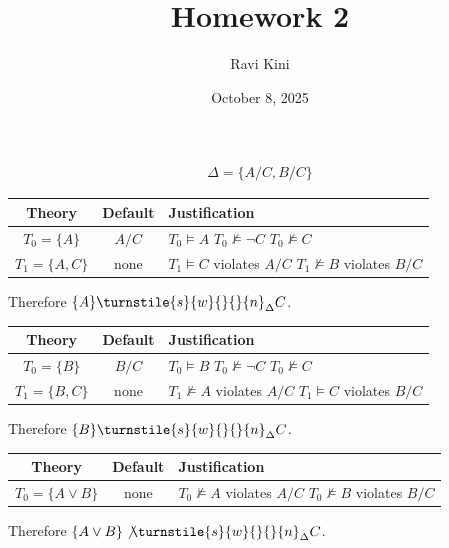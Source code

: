 \documentclass{article}
\title{Homework 2}
\author{Ravi Kini}
\date{October 8, 2025}
\begin{document}
\maketitle

\problem
\begin{align*}
    \Delta = \{A/C, B/C\}
\end{align*}
\begin{center}
    \begin{tabular}{|c|c|p{50mm}|}
        \hline
        Theory & Default & Justification \\
        \hline
        $T_0 = \{A\}$ & $A/C$ & $T_0 \vDash A$ \newline $T_0 \not\vDash \lnot C$ \newline $T_0 \not\vDash C$ \\
        \hline
        $T_1 = \{A, C\}$ & none & $T_1 \vDash C$ violates $A/C$ \newline $T_1 \not\vDash B$ violates $B/C$ \\
        \hline
    \end{tabular}
\end{center}
Therefore $\{A\} \turnstile{s}{w}{}{}{n}_\Delta C$.
\begin{center}
    \begin{tabular}{|c|c|p{50mm}|}
        \hline
        Theory & Default & Justification \\
        \hline
        $T_0 = \{B\}$ & $B/C$ & $T_0 \vDash B$ \newline $T_0 \not\vDash \lnot C$ \newline $T_0 \not\vDash C$ \\
        \hline
        $T_1 = \{B, C\}$ & none & $T_1 \not\vDash A$ violates $A/C$ \newline $T_1 \vDash C$ violates $B/C$ \\
        \hline
    \end{tabular}
\end{center}
Therefore $\{B\} \turnstile{s}{w}{}{}{n}_\Delta C$.
\begin{center}
    \begin{tabular}{|c|c|p{50mm}|}
        \hline
        Theory & Default & Justification \\
        \hline
        $T_0 = \{A \lor B\}$ & none & $T_0 \not\vDash A$ violates $A/C$ \newline $T_0 \not\vDash B$ violates $B/C$ \\
        \hline
    \end{tabular}
\end{center}
Therefore $\{A \lor B\} \not\turnstile{s}{w}{}{}{n}_\Delta C$.
\end{document}
